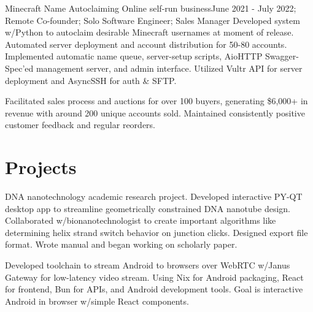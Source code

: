 \documentclass[letterpaper, 10pt]{article}
\begin{document}
\resumeSubheading
{Minecraft Name Autoclaiming }{Online self-run business}{June 2021 - July 2022; Remote}
{Co-founder; Solo Software Engineer; Sales Manager}{}{}
\resumeItemListStart
{}
{Developed system w/Python to autoclaim desirable Minecraft usernames at moment of release. Automated server deployment and account distribution for 50-80 accounts. Implemented automatic name queue, server-setup scripts, AioHTTP Swagger-Spec'ed management server, and admin interface. Utilized Vultr API for server deployment and AsyncSSH for auth \& SFTP.}

{Facilitated sales process and auctions for over 100 buyers, generating \$6,000+ in revenue with around 200 unique accounts sold. Maintained consistently positive customer feedback and regular reorders.}
\resumeItemListEnd

\resumeSubHeadingListEnd

\vspace{-16pt}

\section{Projects}
\resumeSubHeadingListStart
{}
{DNA nanotechnology academic research project. Developed interactive PY-QT desktop app to streamline geometrically constrained DNA nanotube design. Collaborated w/bionanotechnologist to create important algorithms like determining helix strand switch behavior on junction clicks. Designed export file format. Wrote manual and began working on scholarly paper.}


{Developed toolchain to stream Android to browsers over WebRTC w/Janus Gateway for low-latency video stream. Using Nix for Android packaging, React for frontend, Bun for APIs, and Android development tools. Goal is interactive Android in browser w/simple React components.}
\end{document}
